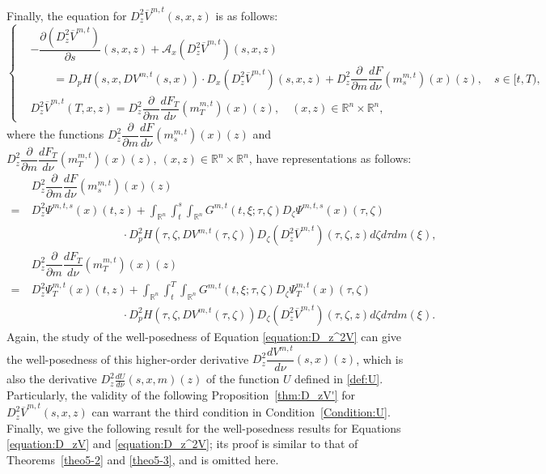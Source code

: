 \documentclass[11pt]{article}
\numberwithin{equation}{section}
\newcommand{\brn}{{\mathbb{R}^n}}
\newcommand{\1}{\mbox{1\hspace{-1mm}I}}
\begin{document}
Finally, the equation for $D_z^2\overline{V}^{m,t}(s,x,z)$ is as follows:
\begin{equation}\label{equation:D_z^2V}
    \left\{
    \begin{aligned}
        &-\dfrac{\partial \left(D_z^2\overline{V}^{m,t}\right)}{\partial s}(s,x,z)+\mathcal{A}_{x}\left(D_z^2\overline{V}^{m,t}\right)(s,x,z)\\
        &\qquad =D_{p}H\left(s,x,DV^{m,t}(s,x)\right)\cdot D_{x}\left(D_z^2\overline{V}^{m,t}\right)(s,x,z) +D_z^2\dfrac{\partial}{\partial m}\dfrac{dF}{d\nu}\left(m^{m,t}_s\right)(x)(z),\quad s\in[t,T),\\
        &D_z^2\overline{V}^{m,t}(T,x,z)=D_z^2 \dfrac{\partial}{\partial m}\dfrac{dF_{T}}{d\nu}\left(m^{m,t}_T\right)(x)(z),\quad (x,z)\in\brn\times\brn,
    \end{aligned}
    \right.
\end{equation}
where the functions $D_z^2\dfrac{\partial}{\partial m}\dfrac{dF}{d\nu}\left(m^{m,t}_s\right)(x)(z)$ and $D_z^2\dfrac{\partial}{\partial m}\dfrac{dF_{T}}{d\nu}\left(m^{m,t}_T\right)(x)(z),\  (x,z)\in\brn\times\brn$, have representations as follows: 
\begin{align*}
    &D_z^2\dfrac{\partial}{\partial m}\dfrac{dF}{d\nu}\left(m^{m,t}_s\right)(x)(z)\\
    =\ & D_z^2\Psi^{m,t,s}(x)(t,z)+\int_{\brn}\int_{t}^{s}\int_{\brn}G^{m,t}(t,\xi;\tau,\zeta) D_{\zeta}\Psi^{m,t,s}(x)(\tau,\zeta)\\
    &\qquad\qquad\qquad\qquad \cdot D_{p}^{2}H\left(\tau,\zeta,DV^{m,t}(\tau,\zeta)\right)D_{\zeta}\left(D_z^2\overline{V}^{m,t}\right)(\tau,\zeta,z) d\zeta d\tau dm(\xi),\\
    &D_z^2\dfrac{\partial}{\partial m}\dfrac{dF_T}{d\nu}\left(m^{m,t}_T\right)(x)(z)\\
    =\ & D_z^2\Psi^{m,t}_T(x)(t,z)+\int_{\brn}\int_{t}^{T}\int_{\brn}G^{m,t}(t,\xi;\tau,\zeta) D_{\zeta}\Psi^{m,t}_T(x)(\tau,\zeta)\\
    &\qquad\qquad\qquad\qquad \cdot D_{p}^{2}H\left(\tau,\zeta,DV^{m,t}(\tau,\zeta)\right)D_{\zeta}\left(D_z^2\overline{V}^{m,t}\right)(\tau,\zeta,z) d\zeta d\tau dm(\xi).
\end{align*}
Again, the study of the well-posedness of Equation \eqref{equation:D_z^2V} can give the well-posedness of this higher-order derivative $D_z^2\dfrac{dV^{m,t}}{d\nu}(s,x)(z)$, which is also the derivative $D_z^2\frac{dU}{d\nu}(s,x,m)(z)$ of the function $U$ defined in \eqref{def:U}. Particularly, the validity of the following Proposition~\ref{thm:D_zV'} for $D_z^2\overline{V}^{m,t}(s,x,z)$ can warrant the third condition in Condition~\ref{Condition:U}. Finally, we give the following result for the well-posedness results for Equations \eqref{equation:D_zV} and  \eqref{equation:D_z^2V}; its proof is similar to that of Theorems~\ref{theo5-2} and \ref{theo5-3}, and is omitted here. 
\end{document}
